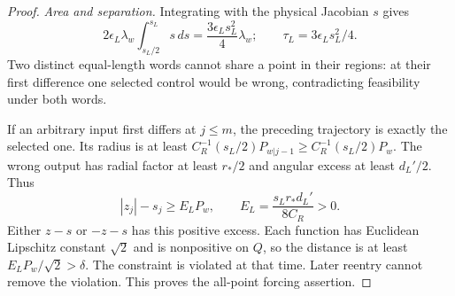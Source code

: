 \documentclass[11pt]{amsart}
\theoremstyle{definition}
\theoremstyle{remark}
\numberwithin{equation}{section}
\begin{document}
\begin{proof}
\smallskip
\emph{Area and separation.}
Integrating with the physical Jacobian $s$ gives
\[
2\epsilon_L\lambda_w\int_{s_L/2}^{s_L}s\,ds
 =\frac{3\epsilon_Ls_L^2}{4}\lambda_w;
\qquad \tau_L=3\epsilon_Ls_L^2/4.
\]
Two distinct equal-length words cannot share a point in their
regions: at their first difference one selected control would
be wrong, contradicting feasibility under both words.

If an arbitrary input first differs at $j\le m$, the preceding
trajectory is exactly the selected one. Its radius is at least
$C_R^{-1}(s_L/2)P_{w|j-1}\ge C_R^{-1}(s_L/2)P_w$.
The wrong output has radial factor at least $r_*/2$ and angular
excess at least $d_L'/2$. Thus
\begin{equation}\label{eq:massmargin}
|z_j|-s_j\ge E_LP_w,\qquad
                         E_L=\frac{s_Lr_*d_L'}{8C_R}>0.
\end{equation}
Either $z-s$ or $-z-s$ has this positive excess. Each function
has Euclidean Lipschitz constant $\sqrt2$ and is nonpositive on
$Q$, so the distance is at least $E_LP_w/\sqrt2>\delta$.
The constraint is violated at that time. Later reentry cannot
remove the violation. This proves the all-point forcing assertion.
\end{proof}
\end{document}
